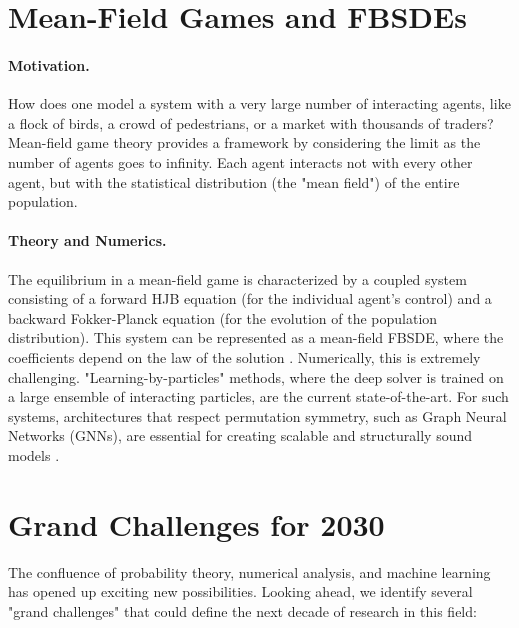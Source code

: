 \section{Mean-Field Games and FBSDEs}
\label{sec:meanfield}

\paragraph{Motivation.} How does one model a system with a very large number of interacting agents, like a flock of birds, a crowd of pedestrians, or a market with thousands of traders? Mean-field game theory provides a framework by considering the limit as the number of agents goes to infinity. Each agent interacts not with every other agent, but with the statistical distribution (the "mean field") of the entire population.

\paragraph{Theory and Numerics.} The equilibrium in a mean-field game is characterized by a coupled system consisting of a forward HJB equation (for the individual agent's control) and a backward Fokker-Planck equation (for the evolution of the population distribution). This system can be represented as a mean-field FBSDE, where the coefficients depend on the law of the solution \cite{Carmona2016}. Numerically, this is extremely challenging. "Learning-by-particles" methods, where the deep solver is trained on a large ensemble of interacting particles, are the current state-of-the-art. For such systems, architectures that respect permutation symmetry, such as Graph Neural Networks (GNNs), are essential for creating scalable and structurally sound models \cite{MAGNet2019, GMADDPG2023}.

\section{Grand Challenges for 2030}
\label{sec:challenges}

The confluence of probability theory, numerical analysis, and machine learning has opened up exciting new possibilities. Looking ahead, we identify several "grand challenges" that could define the next decade of research in this field:

